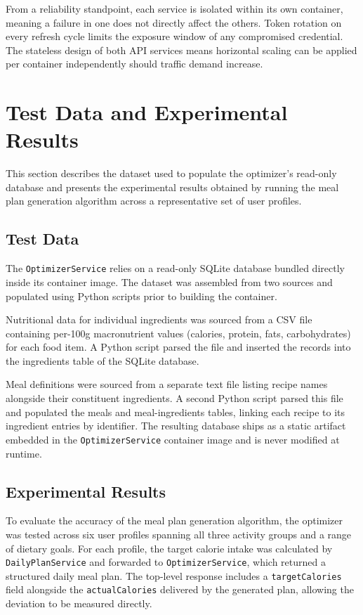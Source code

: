 From a reliability standpoint, each service is isolated within its own container, meaning
a failure in one does not directly affect the others. Token rotation on every refresh cycle
limits the exposure window of any compromised credential. The stateless design of both API
services means horizontal scaling can be applied per container independently should traffic
demand increase.

\newpage
\section{Test Data and Experimental Results}

This section describes the dataset used to populate the optimizer's read-only database
and presents the experimental results obtained by running the meal plan generation
algorithm across a representative set of user profiles.

\subsection{Test Data}

The \texttt{OptimizerService} relies on a read-only SQLite database bundled directly
inside its container image. The dataset was assembled from two sources and populated
using Python scripts prior to building the container.

Nutritional data for individual ingredients was sourced from a CSV file containing
per-100g macronutrient values (calories, protein, fats, carbohydrates) for each food
item. A Python script parsed the file and inserted the records into the ingredients
table of the SQLite database.

Meal definitions were sourced from a separate text file listing recipe names alongside
their constituent ingredients. A second Python script parsed this file and populated
the meals and meal-ingredients tables, linking each recipe to its ingredient entries
by identifier. The resulting database ships as a static artifact embedded in the
\texttt{OptimizerService} container image and is never modified at runtime.

\subsection{Experimental Results}

To evaluate the accuracy of the meal plan generation algorithm, the optimizer was
tested across six user profiles spanning all three activity groups and a range of
dietary goals. For each profile, the target calorie intake was calculated by
\texttt{DailyPlanService} and forwarded to \texttt{OptimizerService}, which returned
a structured daily meal plan. The top-level response includes a \texttt{targetCalories}
field alongside the \texttt{actualCalories} delivered by the generated plan, allowing
the deviation to be measured directly.

